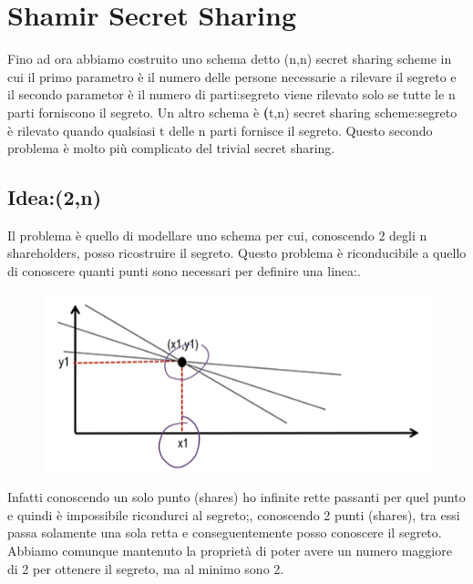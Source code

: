\documentclass{book}
\begin{document}
\section{Shamir Secret Sharing}
Fino ad ora abbiamo costruito uno schema detto (n,n) secret sharing scheme in cui il primo parametro è il numero delle persone necessarie a rilevare il segreto e il secondo parametor è il numero di parti:\@il segreto viene rilevato solo se tutte le n parti forniscono il segreto\@.\newline
Un altro schema è \textbf(t,n) secret sharing scheme:\@il segreto è rilevato quando qualsiasi t delle n parti fornisce il segreto\@. Questo secondo problema è molto più complicato del trivial secret sharing\@.
\subsection{Idea:\@Schema (2,n)}
Il problema è quello di modellare uno schema per cui, conoscendo 2 degli n shareholders, posso ricostruire il segreto\@. Questo problema è riconducibile a quello di conoscere quanti punti sono necessari per definire una linea:\@.
\begin{figure}[h]
    \centering
    \includegraphics[scale=0.5]{2021-12-26-18-33-00.png}%
\end{figure}
Infatti conoscendo un solo punto (shares) ho infinite rette passanti per quel punto e quindi è impossibile ricondurci al segreto;\@tuttavia, conoscendo 2 punti (shares), tra essi passa solamente una sola retta e conseguentemente posso conoscere il segreto\@. Abbiamo comunque mantenuto la proprietà di poter avere un numero maggiore di 2 per ottenere il segreto, ma al minimo sono 2\@.
\end{document}

